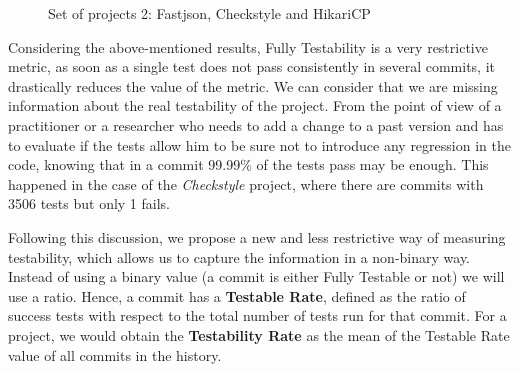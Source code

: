 \begin{figure}[!htb]
\begin{minipage}{.5\linewidth}
        \label{fig:hikari}
    \end{minipage}%
    \caption{Set of projects 2: Fastjson, Checkstyle and HikariCP}
    \label{fig:projects-2}
\end{figure}

\begin{table}[h!]
    \caption{Metrics of set of projects 1: Fastjson, Checkstyle and HikariCP}
    \centering
    \label{table:projects-2}
\end{table}

Considering the above-mentioned results, Fully Testability is a very restrictive metric, as soon as a single test does not pass consistently in several commits, it drastically reduces the value of the metric. 
We can consider that we are missing information about the real testability of the project.
From the point of view of a practitioner or a researcher who needs to add a change to a past version and has to evaluate if the tests allow him to be sure not to introduce any regression in the code, knowing that in a commit 99.99\% of the tests pass may be enough.
This happened in the case of the \textit{Checkstyle} project, where there are commits with 3506 tests but only 1 fails.

Following this discussion, we propose a new and less restrictive way of measuring testability, which allows us to capture the information in a non-binary way. 
Instead of using a binary value (a commit is either Fully Testable or not) we will use a ratio. 
Hence, a commit has a \textbf{Testable Rate}, defined as the ratio of success tests with respect to the total number of tests run for that commit.
For a project, we would obtain the \textbf{Testability Rate} as the mean of the Testable Rate value of all commits in the history.

